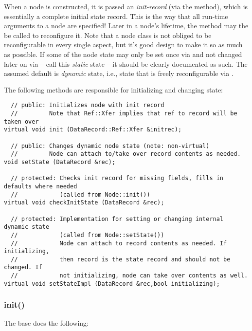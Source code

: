 \documentclass[10pt]{article}
\begin{document}
  When a node is constructed, it is passed an {\em init-record} (via the
   method), which is essentially a complete initial state record.
  This is the way that all run-time arguments to a node are specified! Later 
  in a node's lifetime, the  method may the be called to
  reconfigure  it. Note that a node class is not obliged to be reconfigurable
  in every single aspect, but it's good design to make it so as much as
  possible. If some of the node state may only be set once via  and
  not changed later on via  -- call this {\em static\/} state --
  it should be clearly documented as such. The assumed default is {\em
  dynamic\/} state, i.e., state that is freely reconfigurable via
  .

  The following methods are responsible for initializing and changing state:

\begin{verbatim}
  // public: Initializes node with init record
  //         Note that Ref::Xfer implies that ref to record will be taken over
virtual void init (DataRecord::Ref::Xfer &initrec);

  // public: Changes dynamic node state (note: non-virtual)
  //         Node can attach to/take over record contents as needed.
void setState (DataRecord &rec);

  // protected: Checks init record for missing fields, fills in defaults where needed
  //            (called from Node::init())
virtual void checkInitState (DataRecord &rec);

  // protected: Implementation for setting or changing internal dynamic state 
  //            (called from Node::setState())
  //            Node can attach to record contents as needed. If initializing,
  //            then record is the state record and should not be changed. If
  //            not initializing, node can take over contents as well.
virtual void setStateImpl (DataRecord &rec,bool initializing);
\end{verbatim}

\subsubsection{init()}

  The base  does the following:
\end{document}
